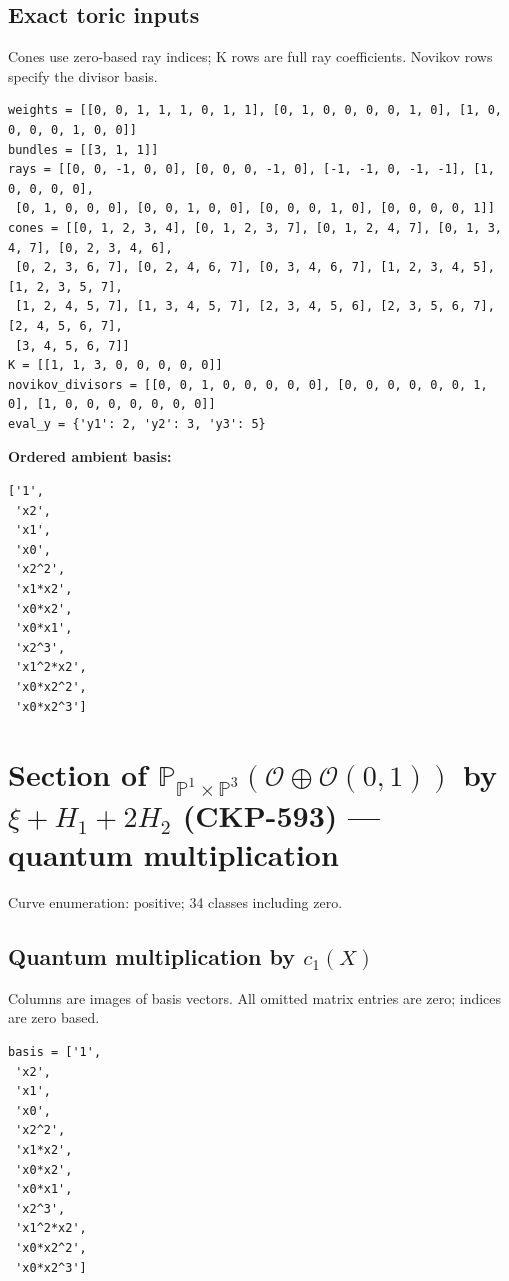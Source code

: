 \documentclass[10pt,a4paper]{article}
\begin{document}
\subsection*{Exact toric inputs}
Cones use zero-based ray indices; K rows are full ray coefficients. Novikov rows specify the divisor basis.

\begin{lstlisting}
weights = [[0, 0, 1, 1, 1, 0, 1, 1], [0, 1, 0, 0, 0, 0, 1, 0], [1, 0, 0, 0, 0, 1, 0, 0]]
bundles = [[3, 1, 1]]
rays = [[0, 0, -1, 0, 0], [0, 0, 0, -1, 0], [-1, -1, 0, -1, -1], [1, 0, 0, 0, 0],
 [0, 1, 0, 0, 0], [0, 0, 1, 0, 0], [0, 0, 0, 1, 0], [0, 0, 0, 0, 1]]
cones = [[0, 1, 2, 3, 4], [0, 1, 2, 3, 7], [0, 1, 2, 4, 7], [0, 1, 3, 4, 7], [0, 2, 3, 4, 6],
 [0, 2, 3, 6, 7], [0, 2, 4, 6, 7], [0, 3, 4, 6, 7], [1, 2, 3, 4, 5], [1, 2, 3, 5, 7],
 [1, 2, 4, 5, 7], [1, 3, 4, 5, 7], [2, 3, 4, 5, 6], [2, 3, 5, 6, 7], [2, 4, 5, 6, 7],
 [3, 4, 5, 6, 7]]
K = [[1, 1, 3, 0, 0, 0, 0, 0]]
novikov_divisors = [[0, 0, 1, 0, 0, 0, 0, 0], [0, 0, 0, 0, 0, 0, 1, 0], [1, 0, 0, 0, 0, 0, 0, 0]]
eval_y = {'y1': 2, 'y2': 3, 'y3': 5}
\end{lstlisting}

\textbf{Ordered ambient basis:}
\begin{lstlisting}
['1',
 'x2',
 'x1',
 'x0',
 'x2^2',
 'x1*x2',
 'x0*x2',
 'x0*x1',
 'x2^3',
 'x1^2*x2',
 'x0*x2^2',
 'x0*x2^3']
\end{lstlisting}

\clearpage\section*{Section of $\mathbb P_{\mathbb P^{1}\times \mathbb P^{3}}(\mathcal O\oplus \mathcal O(0,1))$ by $\xi +H_{1}+2H_{2}$ (CKP-593) --- quantum multiplication}

Curve enumeration: positive; 34 classes including zero.
\subsection*{Quantum multiplication by $c_1(X)$}
Columns are images of basis vectors. All omitted matrix entries are zero; indices are zero based.

\begin{lstlisting}
basis = ['1',
 'x2',
 'x1',
 'x0',
 'x2^2',
 'x1*x2',
 'x0*x2',
 'x0*x1',
 'x2^3',
 'x1^2*x2',
 'x0*x2^2',
 'x0*x2^3']
\end{lstlisting}
\end{document}

